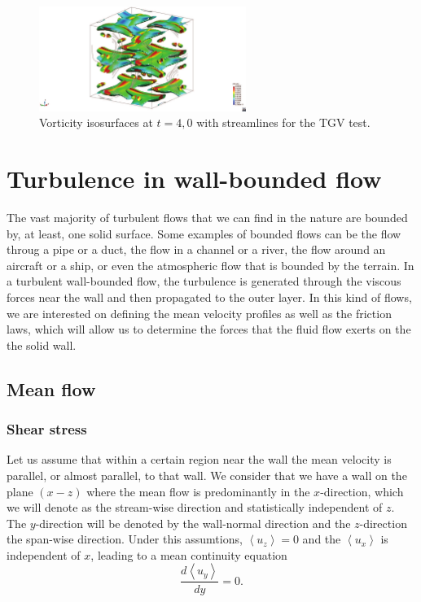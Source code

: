 \begin{figure}[h!]
	\centering	
	\includegraphics[clip=true, trim=13cm 0cm 13cm 0cm, width=0.6\textwidth]{Figures/Chapter3/TGV_isovorti_streaml_veloc_1}
	\caption{Vorticity isosurfaces at $t=4,0$ with streamlines for the TGV test.}
	\label{fig-TGV_vorticity_streamlines}
\end{figure}

\section{Turbulence in wall-bounded flow}
\label{sec-C3_wall_bounded}
The vast majority of turbulent flows that we can find in the nature are bounded by, at least, one solid surface. Some examples of bounded flows can be the flow throug a pipe or a duct, the flow in a channel or a river, the flow around an aircraft or a ship, or even the atmospheric flow that is bounded by the terrain. In a turbulent wall-bounded flow, the turbulence is generated through the viscous forces near the wall and then propagated to the outer layer. In this kind of flows, we are interested on defining the mean velocity profiles as well as the friction laws, which will allow us to determine the forces that the fluid flow exerts on the the solid wall.
\subsection{Mean flow}
\subsubsection{Shear stress}
Let us assume that within a certain region near the wall the mean velocity is parallel, or almost parallel, to that wall. We consider that we have a wall on the plane $ (x-z) $ where the mean flow is predominantly in the $ x $-direction, which we will denote as the stream-wise direction and statistically independent of $ z $. The $ y $-direction will be denoted by the wall-normal direction and the $ z $-direction the span-wise direction. Under this assumtions, $ \left\langle u_z\right\rangle=0 $ and the $ \left\langle u_x\right\rangle $ is independent of $ x $, leading to a mean continuity equation
\begin{equation}
\label{eq-mean_continuity}
\frac{d\left\langle u_y\right\rangle}{dy}=0.
\end{equation}

